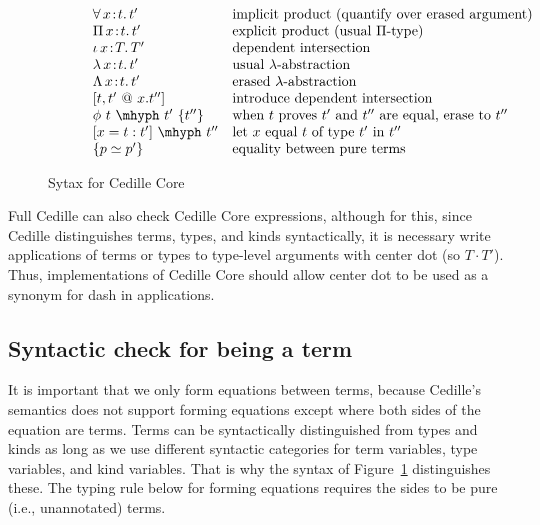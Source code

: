 \documentclass{article}
\newcommand{\abs}[4]{{#1}\, #2\! : \! #3.\, #4}
\begin{document}
\begin{figure}
\[\begin{array}{llll}
  \ &\ & \abs{\forall}{x}{t}{t'}\ &\textnormal{implicit product (quantify over erased argument)} \\
  \ &\ & \abs{\Pi}{x}{t}{t'}\ &\textnormal{explicit product (usual }\Pi\textnormal{-type)} \\
  \ &\ & \abs{\iota}{x}{T}{T'}\ &\textnormal{dependent intersection} \\
  \ &\ & \abs{\lambda}{x}{t}{t'} & \textnormal{usual }\lambda\textnormal{-abstraction} \\
  \ &\ & \abs{\Lambda}{x}{t}{t'} & \textnormal{erased }\lambda\textnormal{-abstraction}\\
  \ &\ & [ t , t' \ @\ x.t'' ] & \textnormal{introduce dependent intersection}\\
  \ &\ & \phi\ t\ \mhyph\ t'\ \{t''\} & \textnormal{when }t\textnormal{ proves }t'\textnormal{ and }t''
                                   \textnormal{ are equal, erase to }t'' \\
  \ & \ & [ x = t : t' ]\ \mhyph\ t'' & \textnormal{let }x\textnormal{ equal }t\textnormal{ of type }t'\textnormal{ in }t'' \\
  \ &\ & \{ p \simeq p' \} &\textnormal{equality between pure terms}
\end{array}
  \]
  \caption{Sytax for Cedille Core}
  \label{fig:syntax}
\end{figure}

Full Cedille can also check Cedille Core expressions, although for
this, since Cedille distinguishes terms, types, and kinds
syntactically, it is necessary write applications of terms or types to type-level arguments with
center dot (so $T \cdot T'$).  Thus, implementations of Cedille Core should allow center dot to be used
as a synonym for dash in applications.

\subsection{Syntactic check for being a term}
\label{sec:termcheck}

It is important that we only form equations between terms, because
Cedille's semantics does not support forming equations except where
both sides of the equation are terms.  Terms can be syntactically
distinguished from types and kinds as long as we use different
syntactic categories for term variables, type variables, and kind
variables.  That is why the syntax of Figure~\ref{fig:syntax}
distinguishes these.  The typing rule below for forming equations
requires the sides to be pure (i.e., unannotated) terms.
\end{document}
